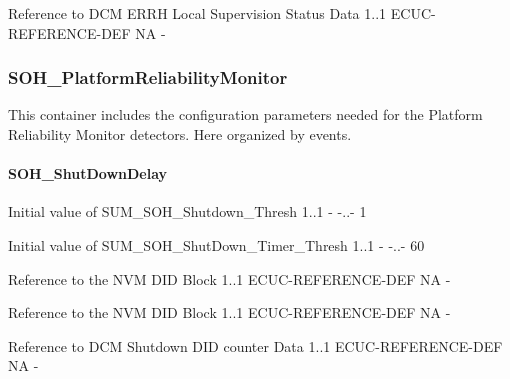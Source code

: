 {
{Reference to DCM ERRH Local Supervision Status Data}
{1..1}
{ECUC-REFERENCE-DEF}
{NA}
{-}}

\subsubsection{SOH_PlatformReliabilityMonitor}
This container includes the configuration parameters needed for the Platform Reliability Monitor detectors. Here organized by events.

\paragraph{SOH_ShutDownDelay}

{
{Initial value of SUM_SOH_Shutdown_Thresh}
{1..1}
{-}
{-..-}
{1}}

{
{Initial value of SUM_SOH_ShutDown_Timer_Thresh}
{1..1}
{-}
{-..-}
{60}}

{
{Reference to the NVM DID Block}
{1..1}
{ECUC-REFERENCE-DEF}
{NA}
{-}}

{
{Reference to the NVM DID Block}
{1..1}
{ECUC-REFERENCE-DEF}
{NA}
{-}}

{
{Reference to DCM Shutdown DID counter Data}
{1..1}
{ECUC-REFERENCE-DEF}
{NA}
{-}}